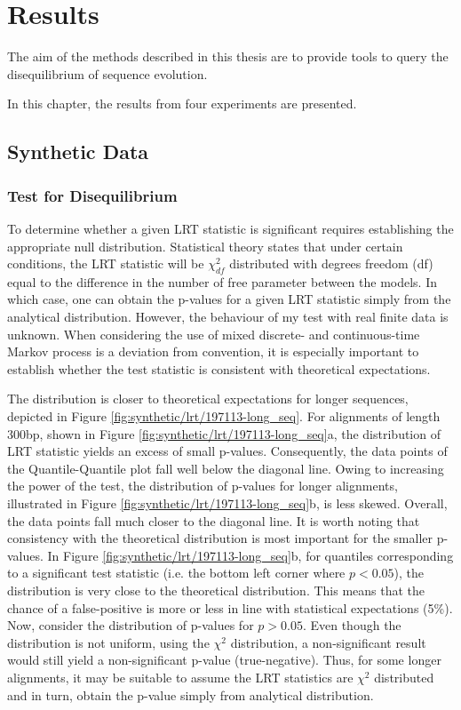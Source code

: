 \chapter{Results}

The aim of the methods described in this thesis are to provide tools to query the disequilibrium of sequence evolution. 

In this chapter, the results from four experiments are presented. 

\section{Synthetic Data}

\subsection{Test for Disequilibrium}

 

To determine whether a given LRT statistic is significant requires establishing the appropriate null distribution. Statistical theory states that under certain conditions, the LRT statistic will be $\chi^2_{df}$ distributed with degrees freedom (df) equal to the difference in the number of free parameter between the models. In which case, one can obtain the p-values for a given LRT statistic simply from the analytical distribution. However, the behaviour of my test with real finite data is unknown. When considering the use of mixed discrete- and continuous-time Markov process is a deviation from convention, it is especially important to establish whether the test statistic is consistent with theoretical expectations. 

The distribution is closer to theoretical expectations for longer sequences, depicted in Figure \ref{fig:synthetic/lrt/197113-long_seq}. For alignments of length 300bp, shown in Figure \ref{fig:synthetic/lrt/197113-long_seq}a, the distribution of LRT statistic yields an excess of small p-values. Consequently, the data points of the Quantile-Quantile plot fall well below the diagonal line. Owing to increasing the power of the test, the distribution of p-values for longer alignments, illustrated in Figure \ref{fig:synthetic/lrt/197113-long_seq}b, is less skewed. Overall, the data points fall much closer to the diagonal line. It is worth noting that consistency with the theoretical distribution is most important for the smaller p-values. In Figure \ref{fig:synthetic/lrt/197113-long_seq}b, for quantiles corresponding to a significant test statistic (i.e. the bottom left corner where $p<0.05$), the distribution is very close to the theoretical distribution. This means that the chance of a false-positive is more or less in line with statistical expectations (5\%). Now, consider the distribution of p-values for $p>0.05$. Even though the distribution is not uniform, using the $\chi^{2}$ distribution, a non-significant result would still yield a non-significant p-value (true-negative). Thus, for some longer alignments, it may be suitable to assume the LRT statistics are $\chi^{2}$ distributed and in turn, obtain the p-value simply from analytical distribution. 



